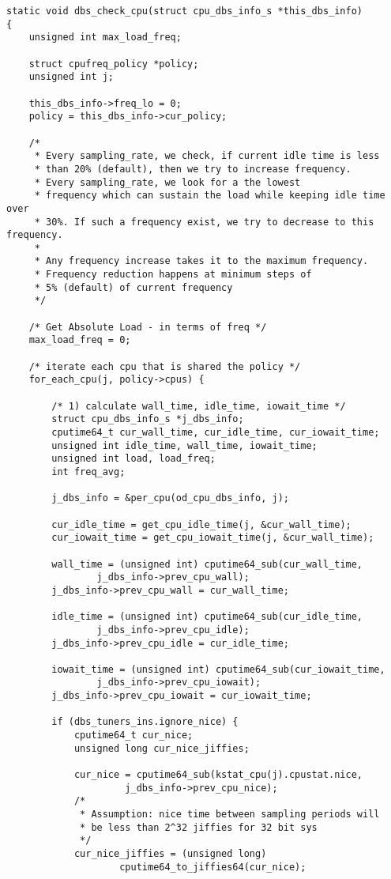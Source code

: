 \begin{lstlisting}
static void dbs_check_cpu(struct cpu_dbs_info_s *this_dbs_info)
{
    unsigned int max_load_freq;

    struct cpufreq_policy *policy;
    unsigned int j;

    this_dbs_info->freq_lo = 0;
    policy = this_dbs_info->cur_policy;

    /*
     * Every sampling_rate, we check, if current idle time is less
     * than 20% (default), then we try to increase frequency.
     * Every sampling_rate, we look for a the lowest
     * frequency which can sustain the load while keeping idle time over
     * 30%. If such a frequency exist, we try to decrease to this frequency.
     *
     * Any frequency increase takes it to the maximum frequency.
     * Frequency reduction happens at minimum steps of
     * 5% (default) of current frequency
     */

    /* Get Absolute Load - in terms of freq */
    max_load_freq = 0;

    /* iterate each cpu that is shared the policy */
    for_each_cpu(j, policy->cpus) {

        /* 1) calculate wall_time, idle_time, iowait_time */
        struct cpu_dbs_info_s *j_dbs_info;
        cputime64_t cur_wall_time, cur_idle_time, cur_iowait_time;
        unsigned int idle_time, wall_time, iowait_time;
        unsigned int load, load_freq;
        int freq_avg;

        j_dbs_info = &per_cpu(od_cpu_dbs_info, j);

        cur_idle_time = get_cpu_idle_time(j, &cur_wall_time);
        cur_iowait_time = get_cpu_iowait_time(j, &cur_wall_time);

        wall_time = (unsigned int) cputime64_sub(cur_wall_time,
                j_dbs_info->prev_cpu_wall);
        j_dbs_info->prev_cpu_wall = cur_wall_time;

        idle_time = (unsigned int) cputime64_sub(cur_idle_time,
                j_dbs_info->prev_cpu_idle);
        j_dbs_info->prev_cpu_idle = cur_idle_time;

        iowait_time = (unsigned int) cputime64_sub(cur_iowait_time,
                j_dbs_info->prev_cpu_iowait);
        j_dbs_info->prev_cpu_iowait = cur_iowait_time;

        if (dbs_tuners_ins.ignore_nice) {
            cputime64_t cur_nice;
            unsigned long cur_nice_jiffies;

            cur_nice = cputime64_sub(kstat_cpu(j).cpustat.nice,
                     j_dbs_info->prev_cpu_nice);
            /*
             * Assumption: nice time between sampling periods will
             * be less than 2^32 jiffies for 32 bit sys
             */
            cur_nice_jiffies = (unsigned long)
                    cputime64_to_jiffies64(cur_nice);


\end{lstlisting}
